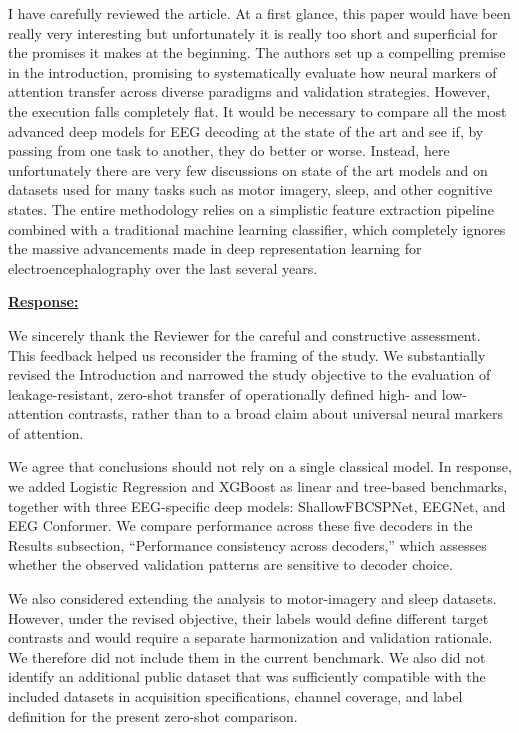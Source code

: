 \documentclass{article}
\begin{document}
\vspace{0.4cm}

\begin{cmt}{}{}

I have carefully reviewed the article. At a first glance, this paper would have
been really very interesting but unfortunately it is really too short and
superficial for the promises it makes at the beginning. The authors set up a
compelling premise in the introduction, promising to systematically evaluate how
neural markers of attention transfer across diverse paradigms and validation
strategies. However, the execution falls completely flat. It would be necessary
to compare all the most advanced deep models for EEG decoding at the state of
the art and see if, by passing from one task to another, they do better or
worse. Instead, here unfortunately there are very few discussions on state of
the art models and on datasets used for many tasks such as motor imagery, sleep,
and other cognitive states. The entire methodology relies on a simplistic
feature extraction pipeline combined with a traditional machine learning
classifier, which completely ignores the massive advancements made in deep
representation learning for electroencephalography over the last several years.

\end{cmt}
\vspace{0.1cm}
\noindent
\underline{\textbf{Response:}}
\vspace{0.2cm}

We sincerely thank the Reviewer for the careful and constructive assessment.
This feedback helped us reconsider the framing of the study. We substantially
revised the Introduction and narrowed the study objective to the evaluation of
leakage-resistant, zero-shot transfer of operationally defined high- and
low-attention contrasts, rather than to a broad claim about universal neural
markers of attention.

We agree that conclusions should not rely on a single classical model. In
response, we added Logistic Regression and XGBoost as linear and tree-based
benchmarks, together with three EEG-specific deep models: ShallowFBCSPNet,
EEGNet, and EEG Conformer. We compare performance across these five decoders in
the Results subsection, ``Performance consistency across decoders,'' which
assesses whether the observed validation patterns are sensitive to decoder
choice.

We also considered extending the analysis to motor-imagery and sleep datasets.
However, under the revised objective, their labels would define different target
contrasts and would require a separate harmonization and validation rationale.
We therefore did not include them in the current benchmark. We also did not
identify an additional public dataset that was sufficiently compatible with the
included datasets in acquisition specifications, channel coverage, and label
definition for the present zero-shot comparison.
\end{document}

